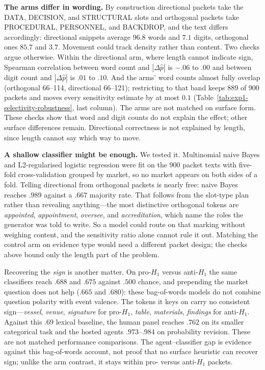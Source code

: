\textbf{The arms differ in wording.} By construction directional packets take the
DATA, DECISION, and STRUCTURAL slots and orthogonal packets take PROCEDURAL,
PERSONNEL, and BACKDROP, and the text differs accordingly: directional snippets
average $96.8$ words and $7.1$ digits, orthogonal ones $85.7$ and $3.7$. Movement
could track density rather than content. Two checks argue otherwise. Within the
directional arm, where length cannot indicate sign, Spearman correlation between
word count and $|\Delta\hat p|$ is $-.06$ to $.00$ and between digit count and
$|\Delta\hat p|$ is $.01$ to $.10$. And the arms' word counts almost fully overlap
(orthogonal 66--114, directional 66--121); restricting to that band keeps 889 of
900 packets and moves every sensitivity estimate by at most $0.1$
(Table~\ref{tab:exp1-selectivity-robustness}, last column). The arms are not
matched on surface form. These checks show that word and digit counts do not
explain the effect; other surface differences remain. Directional correctness is
not explained by length, since length cannot say which way to move.

\textbf{A shallow classifier might be enough.} We tested it. Multinomial naive
Bayes and L2-regularised logistic regression were fit on the 900 packet texts with
five-fold cross-validation grouped by market, so no market appears on both sides
of a fold. Telling directional from orthogonal packets is nearly free: naive Bayes
reaches $.989$ against a $.667$ majority rate. That follows from the slot-type
plan rather than revealing anything---the most distinctive orthogonal tokens are
\emph{appointed}, \emph{appointment}, \emph{oversee}, and \emph{accreditation},
which name the roles the generator was told to write. So a model could route on
that marking without weighing content, and the sensitivity ratio alone cannot rule
it out. Matching the control arm on evidence type would need a different packet
design; the checks above bound only the length part of the problem.

Recovering the \emph{sign} is another matter. On pro-$H_1$ versus anti-$H_1$ the
same classifiers reach $.688$ and $.675$ against $.500$ chance, and prepending the
market question does not help ($.665$ and $.680$): these bag-of-words models do
not combine question polarity with event valence. The tokens it keys on carry no
consistent sign---\emph{vessel}, \emph{venue}, \emph{signature} for pro-$H_1$,
\emph{table}, \emph{materials}, \emph{findings} for anti-$H_1$. Against this $.69$ lexical baseline, the human panel reaches $.762$ on its
smaller categorical task and the hosted agents $.973$--$.984$ on probability
revision. These are not matched performance comparisons. The agent--classifier gap
is evidence against this bag-of-words account, not proof that no surface heuristic
can recover sign; unlike the arm contrast, it stays within pro- versus anti-$H_1$
packets.

